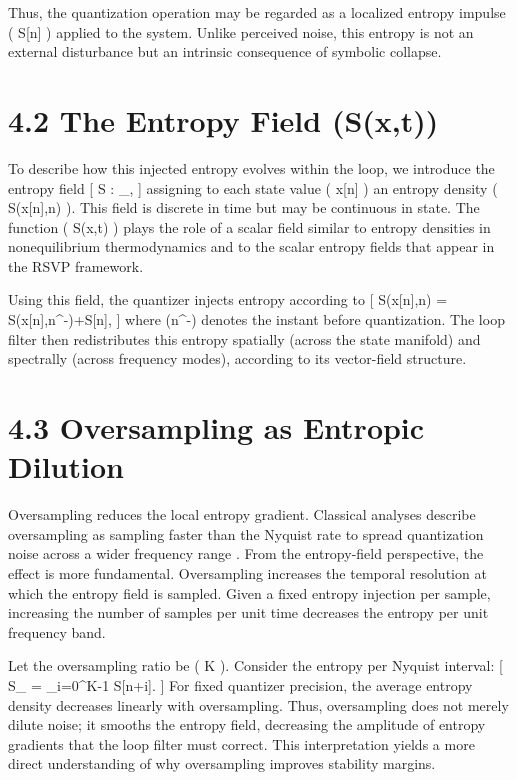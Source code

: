 Thus, the quantization operation may be regarded as a localized entropy impulse ( \Delta S[n] ) applied to the system. Unlike perceived noise, this entropy is not an external disturbance but an intrinsic consequence of symbolic collapse.

\section*{4.2 The Entropy Field (S(x,t))}

To describe how this injected entropy evolves within the loop, we introduce the entropy field
[
S :  \times {} \to {}_{},
]
assigning to each state value ( x[n] \in {} ) an entropy density ( S(x[n],n) ). This field is discrete in time but may be continuous in state. The function ( S(x,t) ) plays the role of a scalar field similar to entropy densities in nonequilibrium thermodynamics \citep{callen1985thermodynamics} and to the scalar entropy fields that appear in the RSVP framework.

Using this field, the quantizer injects entropy according to
[
S(x[n],n) = S(x[n],n^-)+\Delta S[n],
]
where (n^-) denotes the instant before quantization. The loop filter then redistributes this entropy spatially (across the state manifold) and spectrally (across frequency modes), according to its vector-field structure.

\section*{4.3 Oversampling as Entropic Dilution}

Oversampling reduces the local entropy gradient. Classical analyses describe oversampling as sampling faster than the Nyquist rate to spread quantization noise across a wider frequency range \citep{candy1992oversampling}. From the entropy-field perspective, the effect is more fundamental. Oversampling increases the temporal resolution at which the entropy field is sampled. Given a fixed entropy injection per sample, increasing the number of samples per unit time decreases the entropy per unit frequency band.

Let the oversampling ratio be ( K ). Consider the entropy per Nyquist interval:
[
S_{} =  \sum_{i=0}^{K-1} \Delta S[n+i].
]
For fixed quantizer precision, the average entropy density decreases linearly with oversampling. Thus, oversampling does not merely dilute noise; it smooths the entropy field, decreasing the amplitude of entropy gradients that the loop filter must correct. This interpretation yields a more direct understanding of why oversampling improves stability margins.


